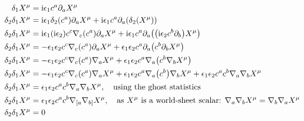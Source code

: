 \begin{align*}
    \delta_1X^\mu&=\textnormal{i}\epsilon_1c^a\partial_a X^\mu\\
    \delta_2\delta_1X^\mu&=\textnormal{i}\epsilon_1\delta_2\qty(c^a)\partial_a X^\mu+\textnormal{i}\epsilon_1c^a\partial_a\qty( \delta_2\qty(X^\mu))\\
    \delta_2\delta_1X^\mu&=\textnormal{i}\epsilon_1\qty(\textnormal{i}\epsilon_2)c^c\nabla_c\qty(c^a)\partial_a X^\mu+\textnormal{i}\epsilon_1c^a\partial_a \qty(\qty(\textnormal{i}\epsilon_2c^b\partial_b)X^\mu)\\
    \delta_2\delta_1X^\mu&=-\epsilon_1\epsilon_2c^c\nabla_c\qty(c^a)\partial_a X^\mu+\epsilon_1\epsilon_2c^a\partial_a \qty(c^b\partial_b X^\mu)\\
    \delta_2\delta_1X^\mu&=-\epsilon_1\epsilon_2c^c\nabla_c\qty(c^a)\nabla_a X^\mu+\epsilon_1\epsilon_2c^a\nabla_a \qty(c^b\nabla_b X^\mu)\\
    \delta_2\delta_1X^\mu&=-\epsilon_1\epsilon_2c^c\nabla_c\qty(c^a)\nabla_a X^\mu+\epsilon_1\epsilon_2c^a\nabla_a \qty(c^b)\nabla_b X^\mu+\epsilon_1\epsilon_2c^ac^b\nabla_a\nabla_b X^\mu\\
    \delta_2\delta_1X^\mu&=\epsilon_1\epsilon_2c^ac^b\nabla_a\nabla_b X^\mu, \ \ \ \textnormal{using the ghost statistics}\\
    \delta_2\delta_1X^\mu&=\epsilon_1\epsilon_2c^ac^b\nabla_{[a}\nabla_{b]} X^\mu,\ \ \ \textnormal{as $X^\mu$ is a world-sheet scalar: }\nabla_a\nabla_b X^\mu=\nabla_b\nabla_a X^\mu\\
    \delta_2\delta_1X^\mu&=0
\end{align*}

